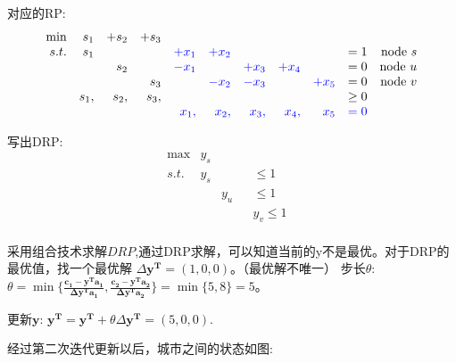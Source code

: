 \documentclass[11pt]{article}
\begin{document}
\begin{CJK}{UTF8}{gbsn}
对应的RP:
\[
\begin{array}{rrrrrrrrrrrrrrrrrl}
 \min & s_1 &+s_2 & +s_3 &     &        &    &     &   & \\
 s.t. & s_1 &     &     & \textcolor{blue}{+x_1}  & \textcolor{blue}{+x_2} &    &     &   & = 1    & \text{node }s  \\
     &      &s_2     &             &  \textcolor{blue}{-x_1}  &     & \textcolor{blue}{+x_3}  &  \textcolor{blue}{+x_4}     &  & =  0  & \text{node }u\\
     &      &          & s_3       &     & \textcolor{blue}{-x_2}    & \textcolor{blue}{-x_3}  &      & \textcolor{blue}{+x_5} & =  0 & \text{node }v \\
     & s_1, &s_2, &s_3,  &      &          &         &         &     & \geq 0 \\
     &         &       &         &  \textcolor{blue}{x_1,} &    \textcolor{blue}{ x_2,} &    \textcolor{blue}{x_3,} &   \textcolor{blue}{x_4,} & \textcolor{blue}{x_5} & \textcolor{blue}{= 0} \\ 	
\end{array} \nonumber
\]

写出DRP:
\[
\begin{array}{rrrrrrrrrl}
 \max & y_s &      & &            &\\
s.t. & y_s  &      & &     \leq 1 &  \\
     &      & y_u  & &     \leq 1 &  \\
     &      &      & & y_v \leq 1 &  \\
\end{array} \nonumber
\]

采用组合技术求解$DRP$,通过DRP求解，可以知道当前的y不是最优。对于DRP的最优值，找一个最优解 $\Delta \mathbf{y^T} = (1, 0, 0)$。（最优解不唯一）
步长$\theta$: $\theta = \min \{ \frac{ \mathbf{c_1 - y^Ta_1} }{ \mathbf{\Delta y^T a_1}  }, \frac{ \mathbf{c_2 - y^Ta_2} }{ \mathbf{\Delta y^T a_2}  }  \} = \min\{ 5, 8\} = 5$。

更新$\mathbf{y}$: $\mathbf{y^T=y^T}+\theta \Delta \mathbf{y^T}  = (5, 0, 0)$.

经过第二次迭代更新以后，城市之间的状态如图:
\begin{figure}[H]
\end{figure}
\end{CJK}
\end{document}
